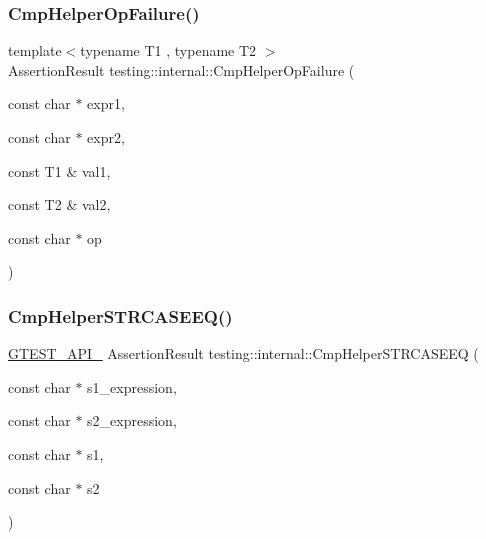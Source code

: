 \mbox{\label{namespacetesting_1_1internal_a894ffccd936d78fd555f490020c27f0a}} 
\subsubsection{\texorpdfstring{Cmp\+Helper\+Op\+Failure()}{CmpHelperOpFailure()}}
{\footnotesize\ttfamily template$<$typename T1 , typename T2 $>$ \\
Assertion\+Result testing\+::internal\+::\+Cmp\+Helper\+Op\+Failure (\begin{DoxyParamCaption}\item[{const char $\ast$}]{expr1,  }\item[{const char $\ast$}]{expr2,  }\item[{const T1 \&}]{val1,  }\item[{const T2 \&}]{val2,  }\item[{const char $\ast$}]{op }\end{DoxyParamCaption})}

\mbox{\label{namespacetesting_1_1internal_a00c3d012df6173622ef558a131bfb95d}} 
\subsubsection{\texorpdfstring{Cmp\+Helper\+S\+T\+R\+C\+A\+S\+E\+E\+Q()}{CmpHelperSTRCASEEQ()}}
{\footnotesize\ttfamily \hyperlink{gtest-port_8h_aa73be6f0ba4a7456180a94904ce17790}{G\+T\+E\+S\+T\+\_\+\+A\+P\+I\+\_\+} Assertion\+Result testing\+::internal\+::\+Cmp\+Helper\+S\+T\+R\+C\+A\+S\+E\+EQ (\begin{DoxyParamCaption}\item[{const char $\ast$}]{s1\+\_\+expression,  }\item[{const char $\ast$}]{s2\+\_\+expression,  }\item[{const char $\ast$}]{s1,  }\item[{const char $\ast$}]{s2 }\end{DoxyParamCaption})}

